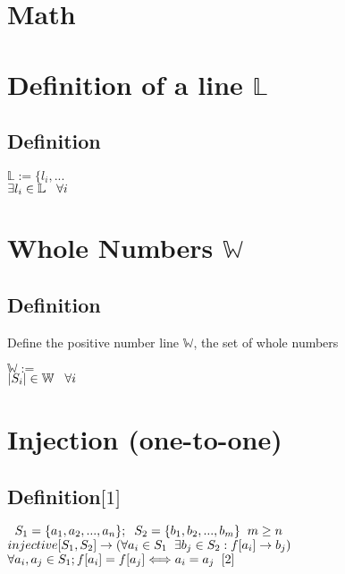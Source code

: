 \documentclass[11pt]{article}
\begin{document}
\section*{Math}





\section{Definition of a line  $\mathbb{L}$}
\subsection{Definition}
\begin{center}
$\mathbb{L} := \{l_i,...$
\\ \vspace{2mm}
$\exists l_i \in \mathbb{L} \hspace{3mm} \forall i$
\end{center}




\section{Whole Numbers $\mathbb{W}$}
\subsection{Definition}
Define the positive number line $\mathbb{W}$, the set of whole numbers
\begin{center}
$\mathbb{W} :=$
\\ \vspace{2mm}
$|S_i| \in \mathbb{W} \hspace{3mm} \forall i$
\end{center}





\section{Injection (one-to-one)}
\subsection{Definition$\lbrack 1 \rbrack$}
\begin{center}
$\hspace{2mm} S_1 = \{a_1,a_2,...,a_n\}; \hspace{2mm} S_2 = \{b_1,b_2,...,b_m\} \hspace{2mm} m \geq n$
\\ \vspace{2mm}
$injective \lbrack S_1, S_2 \rbrack \rightarrow (\forall a_i \in S_1 \hspace{2mm} \exists b_j \in S_2 : f \lbrack a_i \rbrack \rightarrow b_j)$
\\ \vspace{2mm}
$\forall a_i,a_j \in S_1; f \lbrack a_i \rbrack = f \lbrack a_j \rbrack \Longleftrightarrow a_i = a_j \hspace{2mm} \lbrack 2 \rbrack$
\end{center}
\end{document}
